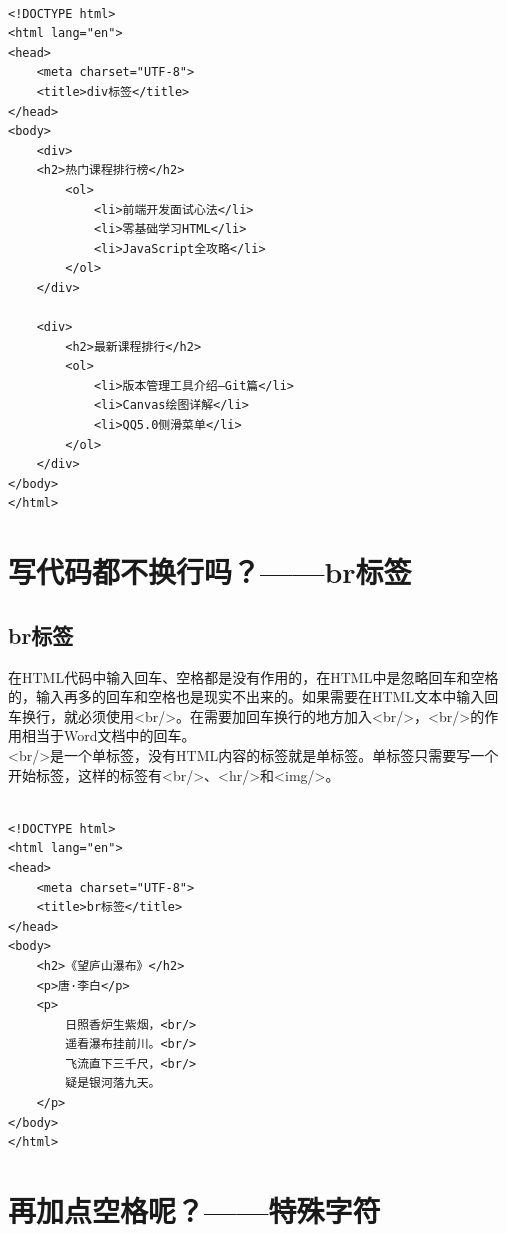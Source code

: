 \\

\begin{lstlisting}[style=htmlcssjs]
<!DOCTYPE html>
<html lang="en">
<head>
    <meta charset="UTF-8">
    <title>div标签</title>
</head>
<body>
    <div>
    <h2>热门课程排行榜</h2>
        <ol>
            <li>前端开发面试心法</li>
            <li>零基础学习HTML</li>
            <li>JavaScript全攻略</li>
        </ol>
    </div>

    <div>
        <h2>最新课程排行</h2>
        <ol>
            <li>版本管理工具介绍—Git篇</li>
            <li>Canvas绘图详解</li>
            <li>QQ5.0侧滑菜单</li>
        </ol>
    </div>
</body>
</html>
\end{lstlisting}

\newpage

\section{写代码都不换行吗？——br标签}

\subsection{br标签}

在HTML代码中输入回车、空格都是没有作用的，在HTML中是忽略回车和空格的，输入再多的回车和空格也是现实不出来的。如果需要在HTML文本中输入回车换行，就必须使用<br/>。在需要加回车换行的地方加入<br/>，<br/>的作用相当于Word文档中的回车。\\

<br/>是一个单标签，没有HTML内容的标签就是单标签。单标签只需要写一个开始标签，这样的标签有<br/>、<hr/>和<img/>。\\

\\

\begin{lstlisting}[style=htmlcssjs]
<!DOCTYPE html>
<html lang="en">
<head>
    <meta charset="UTF-8">
    <title>br标签</title>
</head>
<body>
    <h2>《望庐山瀑布》</h2>
    <p>唐·李白</p>
    <p>
        日照香炉生紫烟，<br/>
        遥看瀑布挂前川。<br/>
        飞流直下三千尺，<br/>
        疑是银河落九天。
    </p>
</body>
</html>
\end{lstlisting}

\newpage

\section{再加点空格呢？——特殊字符}

